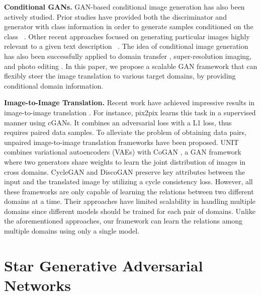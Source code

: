 \medskip

\textbf{Conditional GANs.} GAN-based conditional image generation has also been actively studied. Prior studies have provided both the discriminator and generator with class information in order to generate samples conditioned on the class ~\cite{mirza2014conditional,odena2016semi,odena2016conditional}. Other recent approaches focused on generating particular images highly relevant to a given text description ~\cite{reed2016generative,zhang2016stackgan}. The idea of conditional image generation has also been successfully applied to domain transfer \cite{kim2017learning,taigman2016unsupervised}, super-resolution imaging\cite{Ledig_2017_CVPR}, and photo editing \cite{brock2016neural,Shu_2017_CVPR}. In this paper, we propose a scalable GAN framework that can flexibly steer the image translation to various target domains, by providing conditional domain information. 

\medskip

 \textbf{Image-to-Image Translation.} Recent work have achieved impressive results in image-to-image translation \cite{Isola_2017_CVPR, kim2017learning,liu2017unsupervised,zhu2017unpaired}. For instance, pix2pix \cite{Isola_2017_CVPR} learns this task in a supervised manner using cGANs\cite{mirza2014conditional}. It combines an adversarial loss with a L1 loss, thus requires paired data samples. To alleviate the problem of obtaining data pairs, unpaired image-to-image translation frameworks \cite{kim2017learning,liu2017unsupervised,zhu2017unpaired} have been proposed. UNIT \cite{liu2017unsupervised} combines variational autoencoders (VAEs) \cite{kingma2013auto} with CoGAN \cite{liu2016coupled}, a GAN framework where two generators share weights to learn the joint distribution of images in cross domains. CycleGAN \cite{zhu2017unpaired} and DiscoGAN \cite{kim2017learning} preserve key attributes between the input and the translated image by utilizing a cycle consistency loss. However, all these frameworks are only capable of learning the relations between two different domains at a time. Their approaches have limited scalability in handling multiple domains since different models should be trained for each pair of domains. Unlike the aforementioned approaches, our framework can learn the relations among multiple domains using only a single model.

\section{Star Generative Adversarial Networks} \label{stargan}

